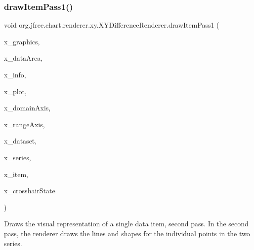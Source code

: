 \subsubsection{\texorpdfstring{draw\+Item\+Pass1()}{drawItemPass1()}}
{\footnotesize\ttfamily void org.\+jfree.\+chart.\+renderer.\+xy.\+X\+Y\+Difference\+Renderer.\+draw\+Item\+Pass1 (\begin{DoxyParamCaption}\item[{Graphics2D}]{x\+\_\+graphics,  }\item[{Rectangle2D}]{x\+\_\+data\+Area,  }\item[{\mbox{\hyperlink{classorg_1_1jfree_1_1chart_1_1plot_1_1_plot_rendering_info}{Plot\+Rendering\+Info}}}]{x\+\_\+info,  }\item[{\mbox{\hyperlink{classorg_1_1jfree_1_1chart_1_1plot_1_1_x_y_plot}{X\+Y\+Plot}}}]{x\+\_\+plot,  }\item[{\mbox{\hyperlink{classorg_1_1jfree_1_1chart_1_1axis_1_1_value_axis}{Value\+Axis}}}]{x\+\_\+domain\+Axis,  }\item[{\mbox{\hyperlink{classorg_1_1jfree_1_1chart_1_1axis_1_1_value_axis}{Value\+Axis}}}]{x\+\_\+range\+Axis,  }\item[{\mbox{\hyperlink{interfaceorg_1_1jfree_1_1data_1_1xy_1_1_x_y_dataset}{X\+Y\+Dataset}}}]{x\+\_\+dataset,  }\item[{int}]{x\+\_\+series,  }\item[{int}]{x\+\_\+item,  }\item[{\mbox{\hyperlink{classorg_1_1jfree_1_1chart_1_1plot_1_1_crosshair_state}{Crosshair\+State}}}]{x\+\_\+crosshair\+State }\end{DoxyParamCaption})\hspace{0.3cm}{\ttfamily [protected]}}

Draws the visual representation of a single data item, second pass. In the second pass, the renderer draws the lines and shapes for the individual points in the two series.


